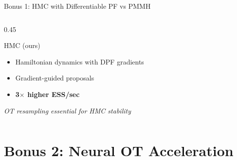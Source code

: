 \documentclass[aspectratio=169,10pt]{beamer}
\newcommand{\highlight}[1]{\textcolor{jpmlightblue}{\textbf{#1}}}
\newcommand{\remark}[1]{\textcolor{jpmaccent}{\textit{#1}}}
\begin{document}
\begin{frame}{Bonus 1: HMC with Differentiable PF vs PMMH}
\begin{columns}[T]
\begin{column}{0.45\textwidth}
\begin{exampleblock}{HMC (ours)}
\begin{itemize}
  \item Hamiltonian dynamics with DPF gradients
  \item Gradient-guided proposals
  \item \highlight{3$\times$ higher ESS/sec}
\end{itemize}
\end{exampleblock}

\vspace{0.3em}
\remark{OT resampling essential for HMC stability}
\end{column}
\end{columns}
\end{frame}


\section{Bonus 2: Neural OT Acceleration}
\end{document}

